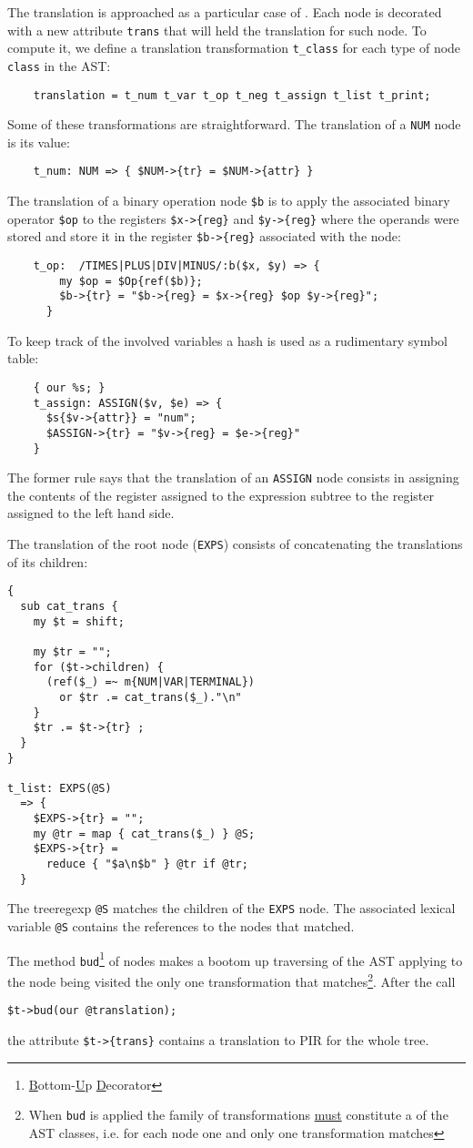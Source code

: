 The translation is approached as a particular case of 
. Each node is decorated with a new
attribute \verb|trans|  that will held 
the translation for such node.
To compute it, we define  a translation transformation
\verb|t_class| for each type of node \verb|class| in the AST:
\begin{verbatim}
    translation = t_num t_var t_op t_neg t_assign t_list t_print;
\end{verbatim}

Some of these transformations are straightforward. 
The translation of a \verb|NUM| node is its value:
\begin{verbatim}
    t_num: NUM => { $NUM->{tr} = $NUM->{attr} }
\end{verbatim}
The translation of a binary operation node \verb|$b|
is to apply the associated
binary operator \verb|$op| to the registers \verb|$x->{reg}| 
and \verb|$y->{reg}| where
the operands were stored and store it in the register
\verb|$b->{reg}| associated with the node:
\begin{verbatim}
    t_op:  /TIMES|PLUS|DIV|MINUS/:b($x, $y) => {
        my $op = $Op{ref($b)};
        $b->{tr} = "$b->{reg} = $x->{reg} $op $y->{reg}";
      }
\end{verbatim}
To keep track of the involved variables
a hash is used as a rudimentary symbol table:
\begin{verbatim}
    { our %s; }
    t_assign: ASSIGN($v, $e) => {
      $s{$v->{attr}} = "num";
      $ASSIGN->{tr} = "$v->{reg} = $e->{reg}"
    }
\end{verbatim}
The former rule says that the translation of an
\verb|ASSIGN| node consists in assigning the contents
of the register assigned to the expression subtree 
to the register assigned to the left hand side.

The translation of the root node (\verb|EXPS|)
consists of concatenating the translations
of its children:
\begin{verbatim}
{
  sub cat_trans {
    my $t = shift;

    my $tr = "";
    for ($t->children) {
      (ref($_) =~ m{NUM|VAR|TERMINAL})
        or $tr .= cat_trans($_)."\n"
    }
    $tr .= $t->{tr} ;
  }
}

t_list: EXPS(@S)
  => {
    $EXPS->{tr} = "";
    my @tr = map { cat_trans($_) } @S;
    $EXPS->{tr} =
      reduce { "$a\n$b" } @tr if @tr;
  }
\end{verbatim}
The treeregexp \verb|@S| matches the children
of the \verb|EXPS| node. The associated lexical variable \verb|@S| 
contains the references to the nodes that 
matched.

The method \verb|bud|\footnote{\underline{B}ottom-\underline{U}p \underline{D}ecorator}
of  nodes makes a bootom up traversing
of the AST applying to the node being visited the only one transformation that 
matches\footnote{When {\tt bud} is applied the family of transformations \underline{must} constitute
a  of the AST classes, i.e. for each node one and only one
transformation matches}.
After the call 
\begin{verbatim}
$t->bud(our @translation);
\end{verbatim}
the attribute \verb|$t->{trans}| contains 
a translation to PIR for the whole tree.
